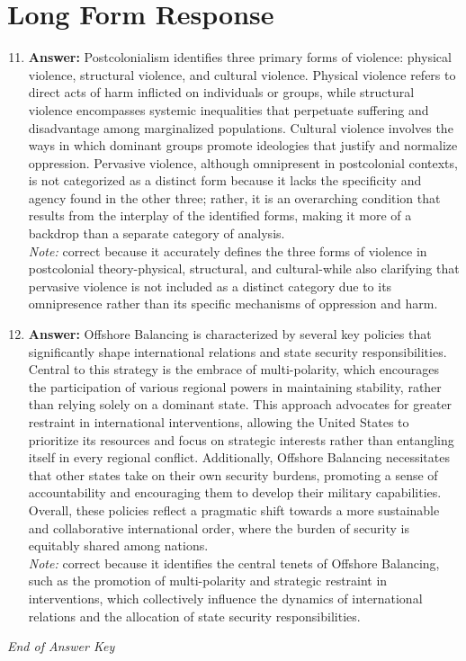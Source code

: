 \documentclass[12pt]{article}
\begin{document}
\section*{Long Form Response}
\begin{enumerate}[label=\arabic*.]
\setcounter{enumi}{10}
\item \textbf{Answer:} Postcolonialism identifies three primary forms of violence: physical violence, structural violence, and cultural violence. Physical violence refers to direct acts of harm inflicted on individuals or groups, while structural violence encompasses systemic inequalities that perpetuate suffering and disadvantage among marginalized populations. Cultural violence involves the ways in which dominant groups promote ideologies that justify and normalize oppression. Pervasive violence, although omnipresent in postcolonial contexts, is not categorized as a distinct form because it lacks the specificity and agency found in the other three; rather, it is an overarching condition that results from the interplay of the identified forms, making it more of a backdrop than a separate category of analysis.
\\ \textit{Note:} correct because it accurately defines the three forms of violence in postcolonial theory-physical, structural, and cultural-while also clarifying that pervasive violence is not included as a distinct category due to its omnipresence rather than its specific mechanisms of oppression and harm.
\item \textbf{Answer:} Offshore Balancing is characterized by several key policies that significantly shape international relations and state security responsibilities. Central to this strategy is the embrace of multi-polarity, which encourages the participation of various regional powers in maintaining stability, rather than relying solely on a dominant state. This approach advocates for greater restraint in international interventions, allowing the United States to prioritize its resources and focus on strategic interests rather than entangling itself in every regional conflict. Additionally, Offshore Balancing necessitates that other states take on their own security burdens, promoting a sense of accountability and encouraging them to develop their military capabilities. Overall, these policies reflect a pragmatic shift towards a more sustainable and collaborative international order, where the burden of security is equitably shared among nations.
\\ \textit{Note:} correct because it identifies the central tenets of Offshore Balancing, such as the promotion of multi-polarity and strategic restraint in interventions, which collectively influence the dynamics of international relations and the allocation of state security responsibilities.
\end{enumerate}

\vfill
\noindent\textit{End of Answer Key}
\end{document}
